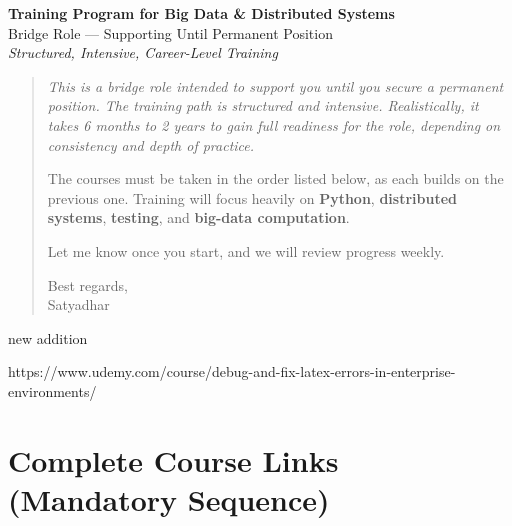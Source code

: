 \documentclass[12pt]{article}
\begin{document}
	
	\begin{center}
		{\Huge\bfseries Training Program for Big Data \& Distributed Systems} \\[0.5cm]
		{\large Bridge Role — Supporting Until Permanent Position} \\[0.3cm]
		{\textit{Structured, Intensive, Career-Level Training}} \\[1cm]
	\end{center}
	
	\begin{quote}
		\emph{This is a bridge role intended to support you until you secure a permanent position. The training path is structured and intensive. Realistically, it takes 6 months to 2 years to gain full readiness for the role, depending on consistency and depth of practice.}
		
		The courses must be taken in the order listed below, as each builds on the previous one. Training will focus heavily on \textbf{Python}, \textbf{distributed systems}, \textbf{testing}, and \textbf{big-data computation}.
		
		Let me know once you start, and we will review progress weekly.
		
		Best regards, \\
		Satyadhar
	\end{quote}
	
	


new addition 

https://www.udemy.com/course/debug-and-fix-latex-errors-in-enterprise-environments/


	\section*{Complete Course Links (Mandatory Sequence)}
	
\end{document}
